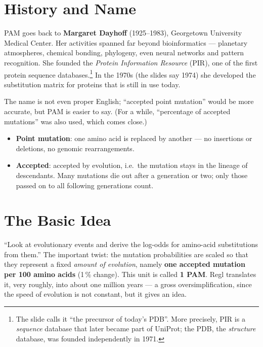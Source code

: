 \documentclass[11pt, oneside]{book}
\let\originalsection\section
\renewcommand{\section}{\Needspace{7\baselineskip}\originalsection}
\begin{document}
\section{History and Name}
\label{sec:pam}

PAM goes back to \textbf{Margaret Dayhoff} (1925--1983), Georgetown University
Medical Center. Her activities spanned far beyond bioinformatics --- planetary
atmospheres, chemical bonding, phylogeny, even neural networks and pattern
recognition. She founded the \emph{Protein Information Resource} (PIR), one
of the first protein sequence databases.\footnote{The slide calls it ``the
precursor of today's PDB''. More precisely, PIR is a \emph{sequence} database
that later became part of UniProt; the PDB, the \emph{structure} database, was
founded independently in 1971.} In the 1970s (the slides say 1974) she
developed the substitution matrix for proteins that is still in use today.

\begin{defbox}[title={PAM = ``Point Accepted Mutation''}]
The name is not even proper English; ``accepted point mutation'' would be
more accurate, but PAM is easier to say. (For a while, ``percentage of accepted
mutations'' was also used, which comes close.)
\begin{itemize}
  \item \textbf{Point mutation}: one amino acid is replaced by another --- no
    insertions or deletions, no genomic rearrangements.
  \item \textbf{Accepted}: accepted by evolution, i.e.\ the mutation stays in the
    lineage of descendants. Many mutations die out after a generation or
    two; only those passed on to all following generations count.
\end{itemize}
\end{defbox}

\section{The Basic Idea}

``Look at evolutionary events and derive the log-odds for amino-acid
substitutions from them.'' The important twist: the mutation probabilities
are scaled so that they represent a fixed \emph{amount of evolution},
namely \textbf{one accepted mutation per 100 amino acids} (1\,\% change).
This unit is called \textbf{1 PAM}. Regl translates it, very roughly, into
about one million years --- a gross oversimplification, since the speed of
evolution is not constant, but it gives an idea.
\end{document}
